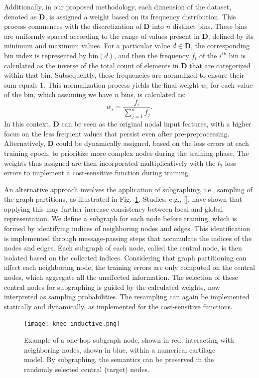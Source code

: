 Additionally, in our proposed methodology, each dimension of the dataset, denoted as \( \mathbf{D} \), is assigned a weight based on its frequency distribution. This process commences with the discretization of \( \mathbf{D} \) into \( n \) distinct bins. These bins are uniformly spaced according to the range of values present in \( \mathbf{D} \), defined by its minimum and maximum values. For a particular value \( d \in \mathbf{D} \), the corresponding bin index is represented by \( \text{bin}(d) \), and then the frequency \( f_i \) of the \( i^\text{th} \) bin is calculated as the inverse of the total count of elements in \( \mathbf{D} \) that are categorized within that bin. Subsequently, these frequencies are normalized to ensure their sum equals 1. This normalization process yields the final weight \( w_i \) for each value of the bin, which assuming we have $n$ bins, is calculated as:
%
\begin{equation}
    w_i = \frac{f_i}{\sum_{j=1}^{n} f_j}.
\end{equation}
%
In this context, \( \mathbf{D} \) can be seen as the original nodal input features, with a higher focus on the less frequent values that persist even after pre-preprocessing. Alternatively, \( \mathbf{D} \) could be dynamically assigned, based on the loss errors at each training epoch, to prioritize more complex nodes during the training phase. The weights thus assigned are then incorporated multiplicatively with the \( l_2 \) loss errors to implement a cost-sensitive function during training.

An alternative approach involves the application of subgraphing, i.e., sampling of the graph partitions, as illustrated in Fig.~\ref{fig:knee_inductive}. Studies, e.g., [\cite{you2020,sun2020,velickovic2018}], have shown that applying this may further increase consistency between local and global representation. We define a subgraph for each node before training, which is formed by identifying indices of neighboring nodes and edges. This identification is implemented through message-passing steps that accumulate the indices of the nodes and edges. Each subgraph of each node, called the central node, is then isolated based on the collected indices. Considering that graph partitioning can affect each neighboring node, the training errors are only computed on the central nodes, which aggregate all the unaffected information. The selection of these central nodes for subgraphing is guided by the calculated weights, now interpreted as sampling probabilities. The resampling can again be implemented statically and dynamically, as implemented for the cost-sensitive functions.
%
\begin{figure}\centering
\texttt{[image: knee\_inductive.png]}
\caption{Example of a one-hop subgraph node, shown in red, interacting with neighboring nodes, shown in blue, within a numerical cartilage model. By subgraphing, the semantics can be preserved in the randomly selected central (target) nodes.}\label{fig:knee_inductive}
\end{figure}

